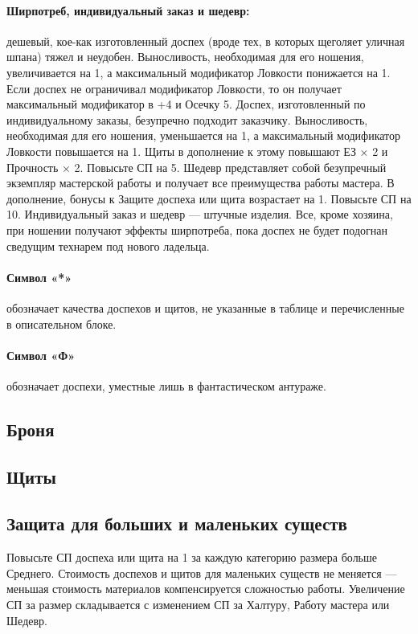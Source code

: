 \paragraph{Ширпотреб, индивидуальный заказ и шедевр:} дешевый, кое-как изготовленный доспех (вроде тех, в которых щеголяет уличная шпана) тяжел и неудобен. Выносливость, необходимая для его ношения, увеличивается на 1, а максимальный модификатор Ловкости понижается на 1. Если доспех не ограничивал модификатор Ловкости, то он получает максимальный модификатор в +4 и Осечку 5.
\newline
Доспех, изготовленный по индивидуальному заказы, безупречно подходит заказчику. Выносливость, необходимая для его ношения, уменьшается на 1, а максимальный модификатор Ловкости повышается на 1. Щиты в дополнение к этому повышают ЕЗ × 2 и Прочность × 2. Повысьте СП на 5.
\newline
Шедевр представляет собой безупречный экземпляр мастерской работы и получает все преимущества работы мастера. В дополнение, бонусы к Защите доспеха или щита возрастает на 1. Повысьте СП на 10.
\newline
Индивидуальный заказ и шедевр — штучные изделия. Все, кроме хозяина, при ношении получают эффекты ширпотреба, пока доспех не будет подогнан сведущим технарем под нового  ладельца.
\paragraph{Символ «*»} обозначает качества доспехов и щитов, не указанные в таблице и перечисленные в описательном блоке.
\paragraph{Символ «Ф»} обозначает доспехи, уместные лишь в фантастическом антураже.
\subsection{Броня}

\subsection{Щиты}


\subsection{Защита для больших и маленьких существ}
Повысьте СП доспеха или щита на 1 за каждую категорию размера больше Среднего. Стоимость доспехов и щитов для маленьких существ не меняется — меньшая стоимость материалов компенсируется сложностью работы. Увеличение СП за размер складывается с изменением СП за Халтуру, Работу мастера или Шедевр.
